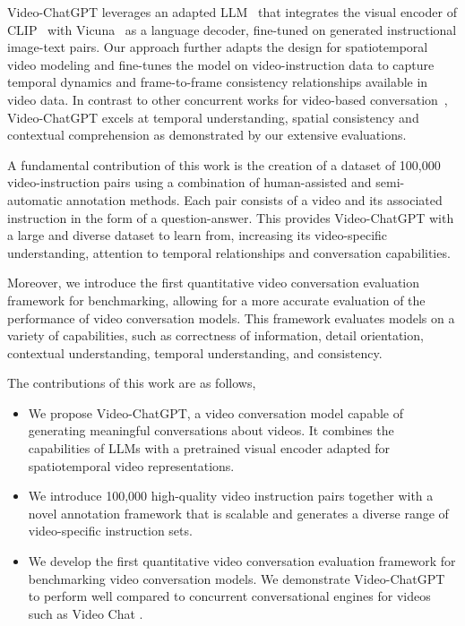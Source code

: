 Video-ChatGPT leverages an adapted LLM~\cite{liu2023llava} that integrates the visual encoder of CLIP~\cite{radford2021learning} with Vicuna~\cite{vicuna2023} as a language decoder, fine-tuned on generated instructional image-text pairs. Our approach further adapts the design for spatiotemporal video modeling and fine-tunes the model on video-instruction data to capture temporal dynamics and frame-to-frame consistency relationships available in video data. In contrast to other concurrent works for video-based conversation~\cite{2023videochat, damonlpsg2023videollama, su2023pandagpt}, Video-ChatGPT excels at temporal understanding, spatial consistency and contextual comprehension as demonstrated by our extensive evaluations. 

A fundamental contribution of this work is the creation of a dataset of 100,000 video-instruction pairs using a combination of human-assisted and semi-automatic annotation methods. Each pair consists of a video and its associated instruction in the form of a question-answer. This provides Video-ChatGPT with a large and diverse dataset to learn from, increasing its video-specific understanding, attention to temporal relationships and conversation capabilities.

Moreover, we introduce the first quantitative video conversation evaluation framework for benchmarking, allowing for a more accurate evaluation of the performance of video conversation models. This framework evaluates models on a variety of capabilities, such as correctness of information, detail orientation, contextual understanding, temporal understanding, and consistency. 

The contributions of this work are as follows,\vspace{-0.5em}
\begin{itemize}\setlength{\itemsep}{0mm}
    \item We propose Video-ChatGPT, a video conversation model capable of generating meaningful conversations about videos. It combines the capabilities of LLMs with a pretrained visual encoder adapted for spatiotemporal video representations.
    \item We introduce 100,000 high-quality video instruction pairs together with a novel annotation framework that is scalable and generates a diverse range of video-specific instruction sets.
    \item We develop the first quantitative video conversation evaluation framework for benchmarking video conversation models. We demonstrate Video-ChatGPT to perform well compared to concurrent conversational engines for videos such as Video Chat \cite{2023videochat}.
\end{itemize}

